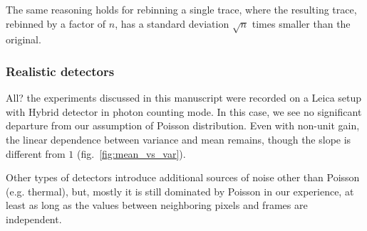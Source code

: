 \documentclass[a4paper,11pt,oneside,]{article}
\begin{document}
The same reasoning holds for rebinning a single trace, where the resulting trace, rebinned by a factor of $n$,  has a standard deviation $\sqrt{n}$ times smaller than the original.


\subsubsection{Realistic detectors}
All{\color{red}?} the experiments discussed in this manuscript were recorded on a Leica setup with Hybrid detector in photon counting mode.
In this case, we see no significant departure from our assumption of Poisson distribution.
Even with non-unit gain, the linear dependence between variance and mean remains, though the slope is different from $1$ (fig.~\ref{fig:mean_vs_var}).

Other types of detectors introduce additional sources of noise other than Poisson (e.g. thermal), but, mostly it is still dominated by Poisson in our experience, at least as long as the values between neighboring pixels and frames are independent.
\end{document}
